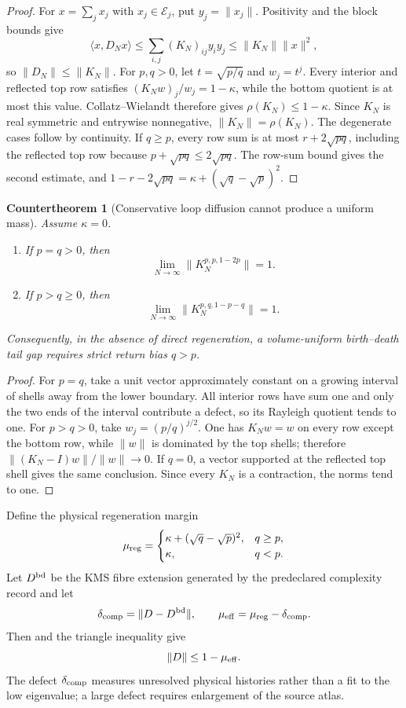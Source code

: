 \documentclass[11pt]{article}
\newtheorem{countertheorem}[theorem]{Countertheorem}
\theoremstyle{definition}
\theoremstyle{remark}
\newcommand{\norm}[1]{\lVert#1\rVert}
\begin{document}
\begin{proof}
For $x=\sum_jx_j$ with $x_j\in\mathcal E_j$, put $y_j=\norm{x_j}$.  Positivity
and the block bounds give
\[
 \langle x,D_Nx\rangle
 \le\sum_{i,j}(K_N)_{ij}y_iy_j
 \le\norm{K_N}\norm{x}^2,
\]
so $\norm{D_N}\le\norm{K_N}$.  For $p,q>0$, let
$t=\sqrt{p/q}$ and $w_j=t^j$.  Every interior and reflected top row satisfies
$(K_Nw)_j/w_j=1-\kappa$, while the bottom quotient is at most this value.
Collatz--Wielandt therefore gives $\rho(K_N)\le1-\kappa$.  Since $K_N$ is real
symmetric and entrywise nonnegative, $\norm{K_N}=\rho(K_N)$.  The degenerate
cases follow by continuity.  If $q\ge p$, every row sum is at most
$r+2\sqrt{pq}$, including the reflected top row because
$p+\sqrt{pq}\le2\sqrt{pq}$.  The row-sum bound gives the second estimate, and
$1-r-2\sqrt{pq}=\kappa+(\sqrt q-\sqrt p)^2$.
\end{proof}

\begin{countertheorem}[Conservative loop diffusion cannot produce a uniform mass]
\label{cth:YM-loop-diffusion-master}
Assume $\kappa=0$.
\begin{enumerate}[label=\textup{(\roman*)},leftmargin=2.7em]
\item If $p=q>0$, then
      \[
       \lim_{N\to\infty}\norm{K_N^{p,p,1-2p}}=1.
      \]
\item If $p>q\ge0$, then
      \[
       \lim_{N\to\infty}\norm{K_N^{p,q,1-p-q}}=1.
      \]
\end{enumerate}
Consequently, in the absence of direct regeneration, a volume-uniform
birth--death tail gap requires strict return bias $q>p$.
\end{countertheorem}

\begin{proof}
For $p=q$, take a unit vector approximately constant on a growing interval of
shells away from the lower boundary.  All interior rows have sum one and only
the two ends of the interval contribute a defect, so its Rayleigh quotient
tends to one.  For $p>q>0$, take $w_j=(p/q)^{j/2}$.  One has $K_Nw=w$ on every
row except the bottom row, while $\norm w$ is dominated by the top shells;
therefore $\norm{(K_N-I)w}/\norm w\to0$.  If $q=0$, a vector supported at the
reflected top shell gives the same conclusion.  Since every $K_N$ is a
contraction, the norms tend to one.
\end{proof}

Define the physical regeneration margin
\[
 \mu_{\rm reg}=
 \begin{cases}
 \kappa+(\sqrt q-\sqrt p)^2,&q\ge p,\\
 \kappa,&q<p.
 \end{cases}
\]
Let $D^{\rm bd}$ be the KMS fibre extension generated by the predeclared
complexity record and let
\[
 \delta_{\rm comp}=\norm{D-D^{\rm bd}},
 \qquad
 \mu_{\rm eff}=\mu_{\rm reg}-\delta_{\rm comp}.
\]
Then  and the triangle inequality give
\[
 \norm D\le1-\mu_{\rm eff}.
\]
The defect $\delta_{\rm comp}$ measures unresolved physical histories rather
than a fit to the low eigenvalue; a large defect requires enlargement of the
source atlas.
\end{document}
